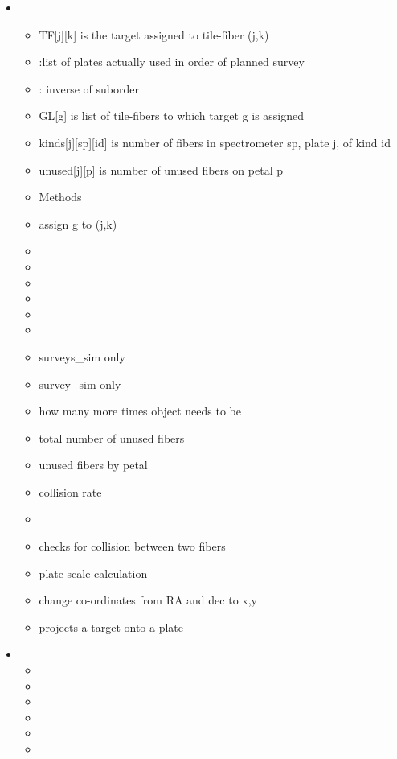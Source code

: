 \documentclass[12pt]{article}
\begin{document}
\begin{itemize}
\item{}
	\begin{itemize}
		\item{} TF[j][k] is the target assigned to tile-fiber (j,k)
		\item{}:list of plates actually used in order of planned survey
		\item{}: inverse of suborder
		\item{} GL[g] is list of tile-fibers to which target g is assigned
		\item{} kinds[j][sp][id] is number of fibers in spectrometer sp, plate j, of kind id
		\item{} unused[j][p] is number of unused fibers on petal p
		\item Methods
		\item {} assign g to (j,k)
		\item {}
		\item {}
		\item {}
		\item {}
		\item {}
		\item {}
		\item {} surveys\_sim only
		\item {} survey\_sim only
		\item {} how many more times object needs to be 
		\item {} total number of unused fibers
		\item {} unused fibers by petal
		\item {} collision rate
		\item{}
		\item {} checks for collision between two fibers
		\item{}plate scale calculation
		\item{} change co-ordinates from RA and dec to x,y
		\item {} projects a target onto a plate
	\end{itemize}
\item{}
	\begin{itemize}
		\item{}
		\item{}
		\item{}
		\item{}
		\item{}
		\item{}
	\end{itemize}	
				
	
	
						

\end{itemize}
	
\end{document}
